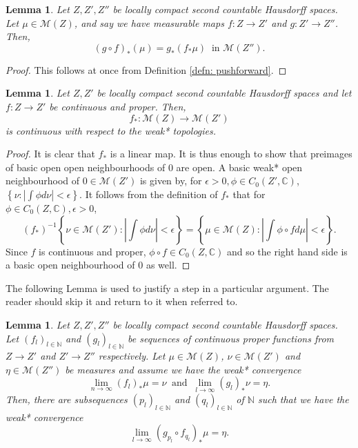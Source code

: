 \documentclass[reqno,11pt, twoside]{amsart}
\theoremstyle{plain}
\newtheorem{lem}[thm]{Lemma}
\theoremstyle{definition}
\theoremstyle{definition}
\theoremstyle{remark}
\numberwithin{equation}{section}
\newcommand\ca[1]{\mathcal{#1}}
\newcommand{\Co}{{\mathbb{C}}}
\newcommand{\N}{{\mathbb{N}}}
\newcommand{\eps}{\epsilon}
\newcommand{\cM}{\mathcal{M}}
\newcommand{\bC}{\mathbb{C}}
\newcommand\seta[1]{\left\{#1\right\}}
\newcommand\av[1]{|#1|}
\begin{document}
\begin{lem}\label{lem: functoriality of pushforwards}
    Let $Z, Z', Z''$ be locally compact second countable Hausdorff spaces. Let $\mu \in \mathcal{M}(Z)$, and say we have measurable maps $f:Z \to Z'$ and $g: Z' \to Z''$.
    Then,
    \begin{equation*}
        (g\circ f)_*(\mu) = g_* (f_* \mu) \ \text{ in } \mathcal{M}(Z'').
    \end{equation*}
\end{lem}
\begin{proof}
    This follows at once from Definition \ref{defn: pushforward}.
\end{proof}
\begin{lem}\label{lem: pushforward is continuous}
    Let $Z, Z'$ be locally compact second countable Hausdorff spaces and let $f : Z \to Z'$ be continuous and proper.
    Then, 
    \begin{equation*}
        f_* : \ca{M}(Z) \to \ca{M}(Z')
    \end{equation*}
    is continuous with respect to  the weak* topologies.
\end{lem}
\begin{proof}
    It is clear that $f_*$ is a linear map. 
    It is thus enough to show that preimages of basic open open neighbourhoods of $0$ are open. A basic weak* open neighbourhood 
    of $0\in \cM(Z')$ is given by, for $\eps>0, \phi \in C_0(Z',\bC)$,  $\seta{\nu:\av{\int \phi d\nu}<\eps}.$ 
    It follows from the definition of $f_*$ that for $\phi \in C_0(Z,\Co), \eps>0$,
    \begin{equation*}
        (f_*)^{-1} \left\lbrace \nu \in \ca{M}(Z') : \left| \int \phi d\nu \right| < \eps \right\rbrace = \left\lbrace \mu \in \ca{M}(Z): \left| \int \phi \circ f d\mu \right|<\eps\right\rbrace.
    \end{equation*}
    Since $f$ is continuous and proper, $\phi\circ f\in C_0(Z,\bC)$ and so the right hand side is a basic open neighbourhood of $0$ as well. 
\end{proof}
The following Lemma is used to justify a step in a particular argument. The reader should skip it and return to it when referred to. 
\begin{lem}\label{lem: convergence transitive}
    Let $Z, Z', Z''$ be locally compact second countable Hausdorff spaces. Let $(f_l)_{l \in \N}$ and $(g_l)_{l \in \N}$ be sequences of continuous proper functions from $Z \to Z'$ and $Z' \to Z''$ respectively.
    Let $\mu \in \mathcal{M}(Z)$, $\nu \in \ca{M}(Z')$ and $\eta \in \ca{M}(Z'')$ be measures and assume we have the weak* convergence
    \begin{equation*}
        \lim_{n \to \infty} (f_l)_* \mu = \nu\ \text{ and }\ \lim_{l \to \infty} (g_l)_* \nu = \eta.
    \end{equation*}
    Then, there are subsequences $(p_l)_{l \in \N}$ and $(q_l)_{l \in \N}$ of $\N$ such that we have the weak* convergence
    \begin{equation*}
        \lim_{l \to \infty} (g_{p_l} \circ f_{q_l})_* \mu = \eta.
    \end{equation*}
\end{lem}
\end{document}

